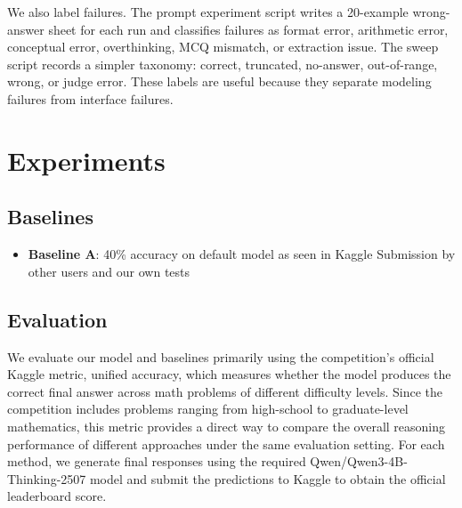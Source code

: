 \documentclass{article}
\begin{document}
We also label failures. The prompt experiment script writes a 20-example wrong-answer sheet for each run and classifies failures as format error, arithmetic error, conceptual error, overthinking, MCQ mismatch, or extraction issue. The sweep script records a simpler taxonomy: correct, truncated, no-answer, out-of-range, wrong, or judge error. These labels are useful because they separate modeling failures from interface failures.





\section{Experiments}
\label{sec:experiments}
% 
\subsection{Baselines}
\label{sec:baselines}
\begin{itemize}
    \item \textbf{Baseline A}: 40\% accuracy on default model as seen in Kaggle Submission by other users and our own tests
\end{itemize}
% 
\subsection{Evaluation}
\label{sec:evaluation}
We evaluate our model and baselines primarily using the competition’s official Kaggle metric, unified accuracy, which measures whether the model produces the correct final answer across math problems of different difficulty levels. Since the competition includes problems ranging from high-school to graduate-level mathematics, this metric provides a direct way to compare the overall reasoning performance of different approaches under the same evaluation setting. For each method, we generate final responses using the required Qwen/Qwen3-4B-Thinking-2507 model and submit the predictions to Kaggle to obtain the official leaderboard score.
\end{document}
